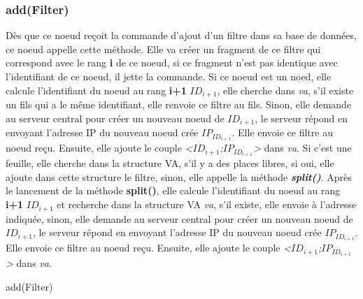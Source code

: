 \documentclass[a4paper,11pt]{report}
\begin{document}
\subsubsection{add(Filter)}
	Dès que ce noeud reçoit la commande d'ajout d'un filtre dans sa base de données, ce noeud appelle cette méthode. Elle va créer un fragment de ce filtre qui correspond avec le rang \textbf{i} de ce noeud, si ce fragment n'est pas identique avec l'identifiant de ce noeud, il jette la commande. Si ce noeud est un noed, elle calcule l'identifiant du noeud au rang \textbf{i+1} $ID_{i+1}$, elle cherche dans \textit{va}, s'il existe un fils qui a le même identifiant, elle renvoie ce filtre au fils. Sinon, elle demande au serveur central pour créer un nouveau noeud de $ID_{i+1}$, le serveur répond en envoyant l'adresse IP du nouveau noeud crée $IP_{ID_{i+1}}$. Elle envoie ce filtre au noeud reçu. Ensuite, elle ajoute le couple \textit{<$ID_{i+1}$;$IP_{ID_{i+1}}$>} dans \textit{va}. Si c'est une feuille, elle cherche dans la structure VA, s'il y a des places libres, si oui, elle ajoute dans cette structure le filtre, sinon, elle appelle la méthode \textbf{\textit{split()}}. Après le lancement de la méthode \textbf{split()}, elle calcule l'identifiant du noeud au rang \textbf{i+1} $ID_{i+1}$ et recherche dans la structure VA \textit{va}, s'il existe, elle envoie à l'adresse indiquée, sinon, elle demande au serveur central pour créer un nouveau noeud de $ID_{i+1}$, le serveur répond en envoyant l'adresse IP du nouveau noeud crée $IP_{ID_{i+1}}$. Elle envoie ce filtre au noeud reçu. Ensuite, elle ajoute le couple \textit{<$ID_{i+1}$;$IP_{ID_{i+1}}$>} dans \textit{va}.

\begin{algorithme}
	add(Filter)
\end{algorithme}
\end{document}
